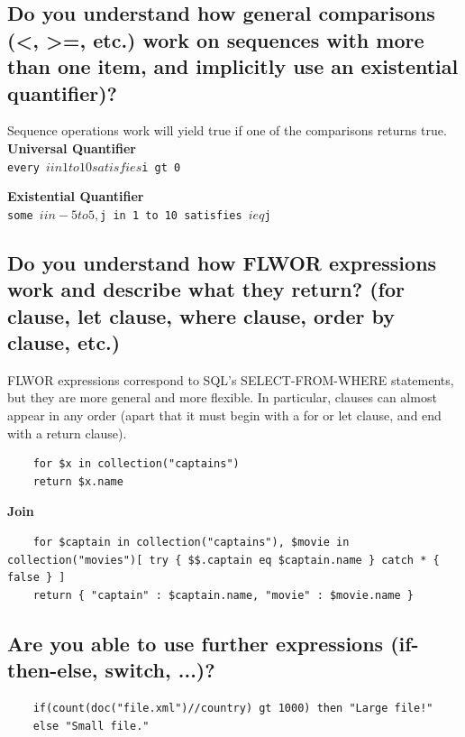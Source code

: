 \documentclass{article}
\begin{document}
\subsection{Do you understand how general comparisons (<, >=, etc.) work on sequences with more than one item, and implicitly use an existential quantifier)?}

Sequence operations work will yield true if one of the comparisons returns true.\\

\textbf{Universal Quantifier}\\
\texttt{every $i in 1 to 10 satisfies $i gt 0}

\textbf{Existential Quantifier}\\
\texttt{some $i in -5 to 5, $j in 1 to 10 satisfies $i eq $j}

\subsection{Do you understand how FLWOR expressions work and describe what they return? (for clause, let clause, where clause, order by clause, etc.)}

FLWOR expressions correspond to SQL's SELECT-FROM-WHERE statements, but they are more general and more flexible. In particular, clauses can almost appear in any order (apart that it must begin with a for or let clause, and end with a return clause).

\begin{verbatim}
    for $x in collection("captains")
    return $x.name
\end{verbatim}

\textbf{Join}

\begin{verbatim}
    for $captain in collection("captains"), $movie in collection("movies")[ try { $$.captain eq $captain.name } catch * { false } ]
    return { "captain" : $captain.name, "movie" : $movie.name }
\end{verbatim}

\subsection{Are you able to use further expressions (if-then-else, switch, ...)?}

\begin{verbatim}
    if(count(doc("file.xml")//country) gt 1000) then "Large file!"
    else "Small file."
\end{verbatim}
\end{document}
